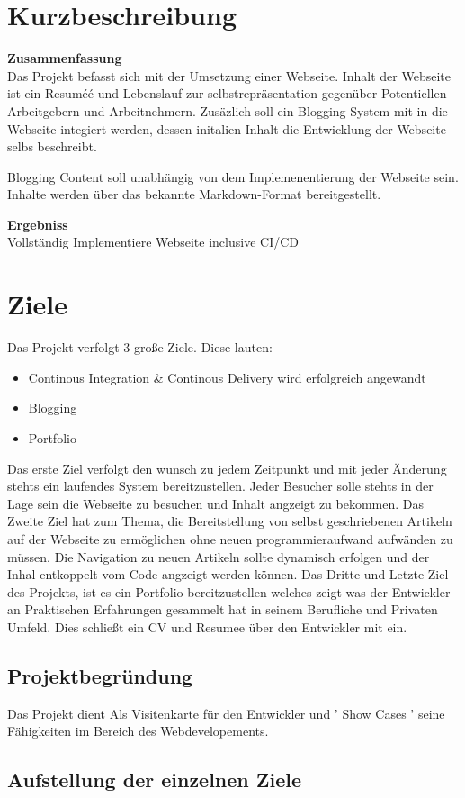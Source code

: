 \section{Kurzbeschreibung}


\textbf{ Zusammenfassung } \\
Das Projekt befasst sich mit der Umsetzung einer Webseite. Inhalt der Webseite ist ein Resuméé 
und Lebenslauf zur selbstrepräsentation gegenüber Potentiellen Arbeitgebern und Arbeitnehmern.
Zusäzlich soll ein Blogging-System mit in die Webseite integiert werden, dessen initalien Inhalt die Entwicklung der
Webseite selbs beschreibt.

Blogging Content soll unabhängig von dem Implemenentierung der Webseite sein. Inhalte werden über
das bekannte Markdown-Format bereitgestellt.

\textbf{ Ergebniss } \\
Vollständig Implementiere Webseite inclusive CI/CD

\section{Ziele}
Das Projekt verfolgt 3 große Ziele. Diese lauten: 
    \begin{itemize}
        \item Continous Integration \& Continous Delivery wird erfolgreich angewandt
        \item Blogging
        \item Portfolio 
    \end{itemize}

Das erste Ziel verfolgt den wunsch zu jedem Zeitpunkt und mit jeder Änderung stehts ein laufendes
System bereitzustellen. Jeder Besucher solle stehts in der Lage sein die Webseite zu besuchen und
Inhalt angzeigt zu bekommen.
Das Zweite Ziel hat zum Thema, die Bereitstellung von selbst geschriebenen Artikeln auf der Webseite
zu ermöglichen ohne neuen programmieraufwand aufwänden zu müssen. Die Navigation zu neuen Artikeln
sollte dynamisch erfolgen und der Inhal entkoppelt vom Code angzeigt werden können.
Das Dritte und Letzte Ziel des Projekts, ist es ein Portfolio bereitzustellen welches zeigt was der
Entwickler an Praktischen Erfahrungen gesammelt hat in seinem Berufliche und Privaten Umfeld. Dies
schließt ein CV und Resumee über den Entwickler mit ein.

\subsection{ Projektbegründung }
Das Projekt dient Als Visitenkarte für den Entwickler und ' Show Cases ' seine Fähigkeiten im Bereich
des Webdevelopements.

\subsection{ Aufstellung der einzelnen Ziele }
